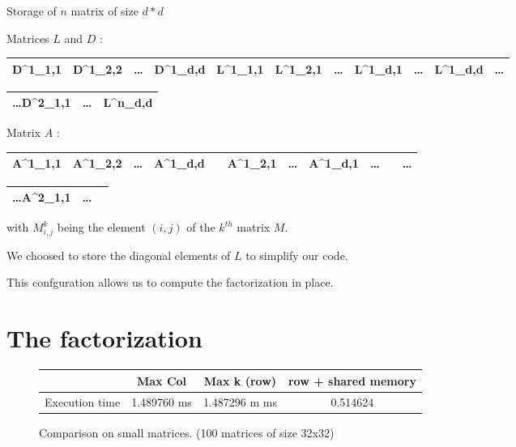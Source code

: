 \documentclass[compress,xcolor=table]{beamer}
\begin{document}
\begin{frame}{}
	Storage of $n$ matrix of size $d*d$

	Matrices $L$ and $D$ :
	\begin{tabular}{|C|C|C|C||C|C|C|C|C|C||C}
		\hline
		D^1_{1,1} & D^1_{2,2} & \dots & D^1_{d,d} & L^1_{1,1} & L^1_{2,1} &
		\dots & L^1_{d,1} & \dots & L^1_{d,d} & \dots\\
		\hline
	\end{tabular}
	\begin{tabular}{C|C|C|}
		\hline
		\dots D^2_{1,1} &  \dots & L^n_{d,d} \\
		\hline
	\end{tabular}

	Matrix $A$ :
	\begin{tabular}{|C|C|C|C||C|C|C|C|C|C||C}
		\hline
		A^1_{1,1} & A^1_{2,2} & \dots & A^1_{d,d} & \emptyset & A^1_{2,1} &
		\dots & A^1_{d,1} & \dots & \emptyset & \dots\\
		\hline
	\end{tabular}
	\begin{tabular}{C|C|C|}
		\hline
		\dots A^2_{1,1} &  \dots & \emptyset \\
		\hline
	\end{tabular}

	with $M^k_{i,j}$ being the element $(i,j)$ of the $k^{th}$ matrix $M$.

	We choosed to store the diagonal elements of $L$ to simplify our code.

	This confguration allows us to compute the factorization in place.
\end{frame}


\section{The factorization}

\begin{frame}{}
	
	\begin{figure}
		\begin{tabular}{c|c|c|c}
			& Max Col & Max k (row) & row + shared memory
			\\
			\hline
			Execution time & 1.489760 ms & 1.487296 m ms & 0.514624  \\
		\end{tabular}
	
	\caption{Comparison on small matrices. (100 matrices of size 32x32)}
	\end{figure}

\end{frame}
\end{document}
